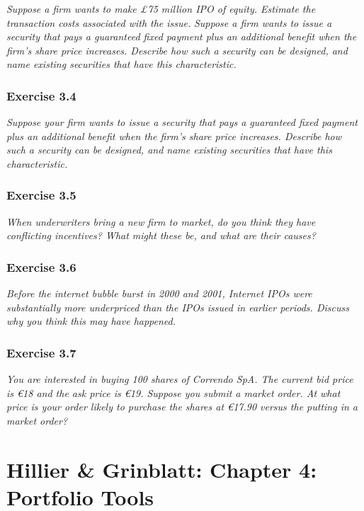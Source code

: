 \documentclass[]{book}
\newcommand{\euro}{€}
\theoremstyle{definition}
\theoremstyle{definition}
\theoremstyle{remark}
\begin{document}
\emph{Suppose a firm wants to make £75 million IPO of equity. Estimate
the transaction costs associated with the issue.} \emph{Suppose a firm
wants to issue a security that pays a guaranteed fixed payment plus an
additional benefit when the firm's share price increases. Describe how
such a security can be designed, and name existing securities that have
this characteristic.} \citep[p.76]{book}

\subsection{Exercise 3.4}\label{exercise-3.4}

\emph{Suppose your firm wants to issue a security that pays a guaranteed
fixed payment plus an additional benefit when the firm's share price
increases. Describe how such a security can be designed, and name
existing securities that have this characteristic.} \citep[p.76]{book}

\subsection{Exercise 3.5}\label{exercise-3.5}

\emph{When underwriters bring a new firm to market, do you think they
have conflicting incentives? What might these be, and what are their
causes?} \citep[p.76]{book}

\subsection{Exercise 3.6}\label{exercise-3.6}

\emph{Before the internet bubble burst in 2000 and 2001, Internet IPOs
were substantially more underpriced than the IPOs issued in earlier
periods. Discuss why you think this may have happened.}
\citep[p.76]{book}

\subsection{Exercise 3.7}\label{exercise-3.7}

\emph{You are interested in buying 100 shares of Correndo SpA. The
current bid price is \euro{}18 and the ask price is \euro{}19. Suppose
you submit a market order. At what price is your order likely to
purchase the shares at \euro{}17.90 versus the putting in a market
order?} \citep[p.76]{book}

\chapter{Hillier \& Grinblatt: Chapter 4: Portfolio
Tools}\label{hillier-grinblatt-chapter-4-portfolio-tools}
\end{document}
